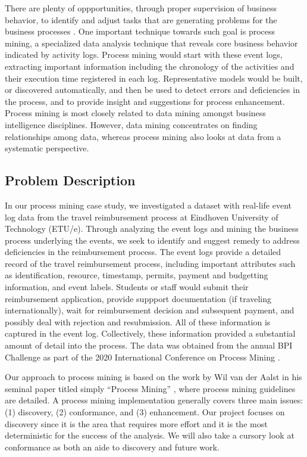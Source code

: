 \documentclass[conference]{IEEEtran}
\begin{document}
There are plenty of oppportunities, through
proper supervision of business behavior, to identify and adjust
tasks that are generating problems for the business processes
\cite{LeAl1994}.
One important technique towards such goal is process mining, a
specialized data analysis technique that reveals core business behavior
indicated by activity logs.
Process mining would start with these event logs, extracting important
information including the chronology of the activities
 and their execution time registered in each log. Representative models
would be built, or discovered automatically,
and then be used to detect errors and deficiencies in the process,
and to provide insight and suggestions for process enhancement.
Process mining is most closely related to data mining 
amongst business intelligence disciplines. However,
data mining concentrates on finding relationships among data,
whereas process mining also looks at data from a systematic
perspective.

\subsection{Problem Description}

In our process mining case study, we investigated
a dataset with
real-life event log data from the travel reimbursement process at
Eindhoven University of Technology (ETU/e). Through analyzing the event
logs and mining the business process underlying the events, we seek to
identify and suggest remedy to address deficiencies in the reimbursement
process.
The event logs provide a detailed record of the travel reimbursement process,
including important attributes such as identification, resource,
timestamp, permits, payment and budgetting information, and event labels.
Students or staff would submit their reimbursement application,
provide suppport documentation (if traveling internationally), wait for
reimbursement decision and subsequent payment, and possibly deal with
rejection and resubmission. All of these information is captured in the
event log.
Collectively, these information provided a substantial amount of detail
into the process. 
The data was obtained from 
the annual BPI Challenge as part of
the 2020 International Conference on Process Mining \cite{BPI2020}.

Our approach to process mining is based on the work by
Wil van der Aalst in his seminal paper titled simply
``Process Mining'' \cite{van2012},
where process mining guidelines are detailed.
A process mining implementation generally
covers three main issues: (1) discovery, (2) conformance,
and (3) enhancement.
Our project focuses on discovery since it is the area
that requires more effort and it is the most deterministic for the
success of the analysis. We will also take a cursory
look at conformance as both an aide to discovery and future work.
\end{document}
